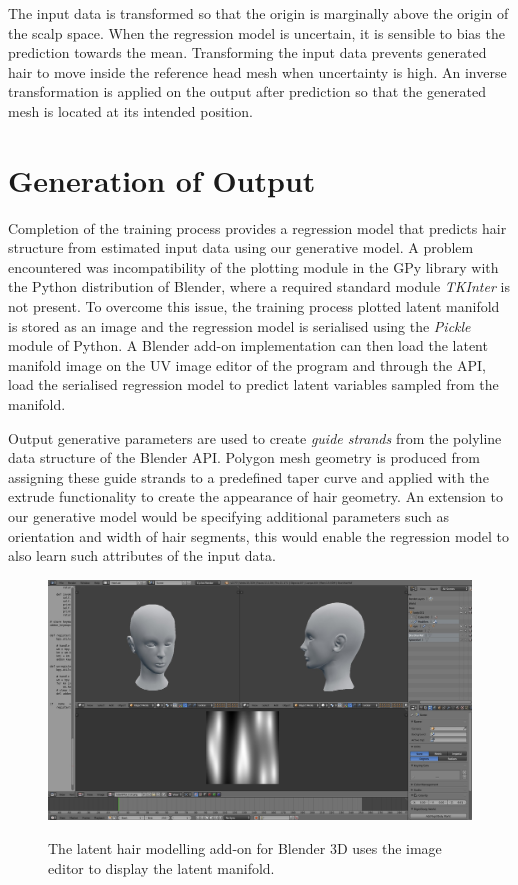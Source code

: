 \documentclass[ %
author={Dillon Keith Diep},
supervisor={Dr. Carl Henrik Ek},
degree={MEng},
title={ART-CG:},
subtitle={Assisted Real-time Content Generation of 3D Hair by Learning Manifolds},
type={Research},
year={2017} ]{dissertation}
\begin{document}
The input data is transformed so that the origin is marginally above the origin of the scalp space. When the regression model is uncertain, it is sensible to bias the prediction towards the mean. Transforming the input data prevents generated hair to move inside the reference head mesh when uncertainty is high. An inverse transformation is applied on the output after prediction so that the generated mesh is located at its intended position. 

\section{Generation of Output}
Completion of the training process provides a regression model that predicts hair structure from estimated input data using our generative model. A problem encountered was incompatibility of the plotting module in the GPy library with the Python distribution of Blender, where a required standard module \textit{TKInter} is not present. To overcome this issue, the training process plotted latent manifold is stored as an image and the regression model is serialised using the \textit{Pickle} module of Python. A Blender add-on implementation can then load the latent manifold image on the UV image editor of the program and through the API, load the serialised regression model to predict latent variables sampled from the manifold.

Output generative parameters are used to create \textit{guide strands} from the polyline data structure of the Blender API. Polygon mesh geometry is produced from assigning these guide strands to a predefined taper curve and applied with the extrude functionality to create the appearance of hair geometry. An extension to our generative model would be specifying additional parameters such as orientation and width of hair segments, this would enable the regression model to also learn such attributes of the input data.

\begin{figure}[!h]
	\centering
	\includegraphics[scale=0.2]{images/latentHairAddon}\\
	\caption{The latent hair modelling add-on for Blender 3D uses the image editor to display the latent manifold.}
	\label{blenderAddon}
\end{figure}
\end{document}
